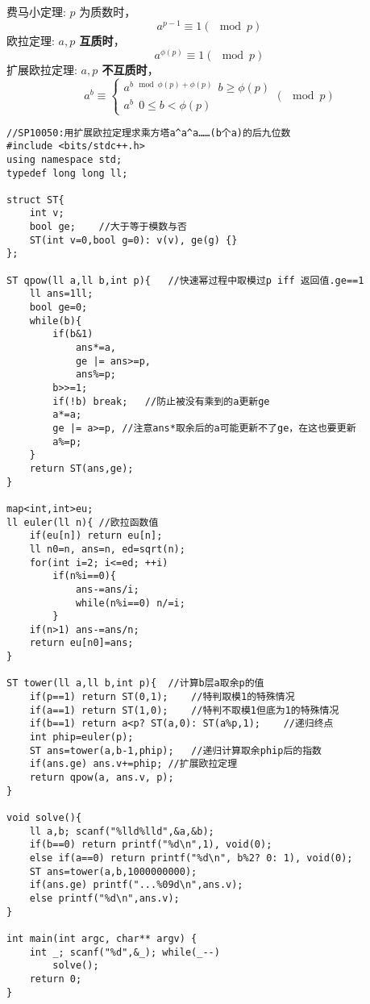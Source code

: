 费马小定理: $p$ 为质数时，$$a^{p-1} \equiv 1 (\mod p) $$
欧拉定理: \textbf{$a,p$ 互质时}， $$a^{\phi(p)} \equiv 1 (\mod p) $$ 
扩展欧拉定理:  \textbf{$a,p$ 不互质时}， 
$$
a^b\equiv
\begin{cases}
a^{b \mod \phi(p) + \phi(p)} \ \ {b \ge \phi(p)} \\
a^b \ \ {0 \le b < \phi(p)}
\end{cases}
(\mod p)
$$
\begin{lstlisting}
//SP10050:用扩展欧拉定理求乘方塔a^a^a……(b个a)的后九位数
#include <bits/stdc++.h>
using namespace std;
typedef long long ll;

struct ST{
	int v;
	bool ge;	//大于等于模数与否
	ST(int v=0,bool g=0): v(v), ge(g) {} 
};

ST qpow(ll a,ll b,int p){	//快速幂过程中取模过p iff 返回值.ge==1
	ll ans=1ll;
	bool ge=0;
	while(b){
		if(b&1)
			ans*=a,
			ge |= ans>=p,
			ans%=p;
		b>>=1;
		if(!b) break;	//防止被没有乘到的a更新ge
		a*=a;
		ge |= a>=p,	//注意ans*取余后的a可能更新不了ge，在这也要更新 
		a%=p;
	}
	return ST(ans,ge);
}

map<int,int>eu;
ll euler(ll n){	//欧拉函数值
	if(eu[n]) return eu[n];
	ll n0=n, ans=n, ed=sqrt(n);
	for(int i=2; i<=ed; ++i)
		if(n%i==0){
			ans-=ans/i;
			while(n%i==0) n/=i;
		}
	if(n>1) ans-=ans/n;
	return eu[n0]=ans;
}

ST tower(ll a,ll b,int p){	//计算b层a取余p的值 
	if(p==1) return ST(0,1);	//特判取模1的特殊情况 
	if(a==1) return ST(1,0);	//特判不取模1但底为1的特殊情况
	if(b==1) return a<p? ST(a,0): ST(a%p,1);	//递归终点
	int phip=euler(p);
	ST ans=tower(a,b-1,phip);	//递归计算取余phip后的指数
	if(ans.ge) ans.v+=phip;	//扩展欧拉定理 
	return qpow(a, ans.v, p);
}

void solve(){
	ll a,b; scanf("%lld%lld",&a,&b);
	if(b==0) return printf("%d\n",1), void(0);
	else if(a==0) return printf("%d\n", b%2? 0: 1), void(0);
	ST ans=tower(a,b,1000000000);
	if(ans.ge) printf("...%09d\n",ans.v);
	else printf("%d\n",ans.v);
}

int main(int argc, char** argv) {
	int _; scanf("%d",&_); while(_--)
		solve();
	return 0;
}

\end{lstlisting}